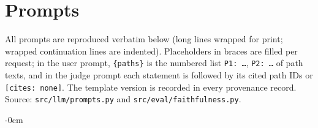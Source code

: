 \documentclass[electronics,article,submit]{Definitions/mdpi}
\begin{document}

\appendixstart
\appendix
\section{Prompts}\label{app:prompts}
All prompts are reproduced verbatim below (long lines wrapped for print; wrapped continuation lines are indented). Placeholders in braces are filled per request; in the user prompt, \texttt{\{paths\}} is the numbered list \texttt{P1: \ldots}, \texttt{P2: \ldots} of path texts, and in the judge prompt each statement is followed by its cited path IDs or \texttt{[cites: none]}. The template version is recorded in every provenance record. Source: \texttt{src/llm/prompts.py} and \texttt{src/eval/faithfulness.py}.



\begin{adjustwidth}{-\extralength}{0cm}

\end{adjustwidth}
\end{document}

